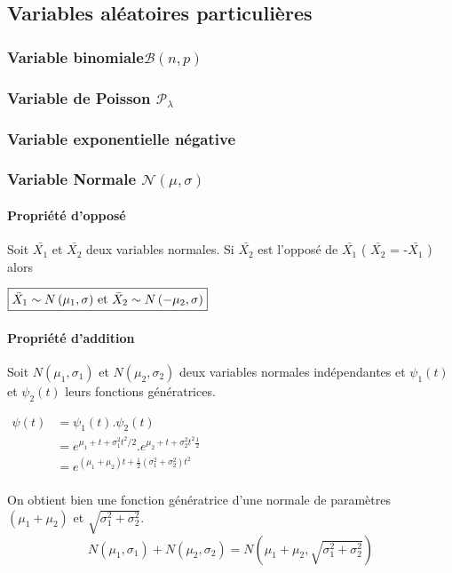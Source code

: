 \newpage
\subsection{Variables aléatoires particulières}


\subsubsection{Variable binomiale$\mathcal{B}(n,p)$}
\subsubsection{Variable de Poisson $\mathcal{P}_\lambda$}
\subsubsection{Variable exponentielle négative}
\subsubsection{Variable Normale $\mathcal{N}(\mu,\sigma)$}




\paragraph{Propriété d'opposé}\label{propriete-normale-oppose}
Soit $\bar{X_1}$ et $\bar{X_2}$ deux variables normales. Si $\bar{X_2}$ est l'opposé de $\bar{X_1}$ ( $\bar{X_2}$ = -$\bar{X_1}$ ) alors
\begin{center}
$\boxed{\bar{X}_1 \sim N \left( \mu_1, \sigma \right)$ et $\bar{X}_2 \sim N \left( -\mu_2, \sigma \right)}$
\end{center}




\paragraph{Propriété d'addition}\label{propriete-normale-addition}
Soit $N(\mu_1,\sigma_1)$ et $N(\mu_2,\sigma_2)$ deux variables normales indépendantes et $\psi_1(t)$ et $\psi_2(t)$ leurs fonctions génératrices.
\begin{center}
$\begin{array}{LL}
\psi(t) &= \psi_1(t).\psi_2(t)\\
        &= e^{\mu_1+t+\sigma_1^2t^2/2}.e^{\mu_2+t+\sigma_2^2t^2\frac{1}{2}}\\
        &= e^{(\mu_1+\mu_2)t+\frac{1}{2}(\sigma_1^2+\sigma_2^2)t^2}\\
\end{array}$
\end{center}
On obtient bien une fonction génératrice d'une normale de paramètres $(\mu_1+\mu_2)$ et $\sqrt{\sigma_1^2+\sigma_2^2}$.
$$\boxed{N(\mu_1,\sigma_1) + N(\mu_2,\sigma_2) = N\left(\mu_1+\mu_2,\sqrt{\sigma_1^2+\sigma_2^2}\right)}$$







